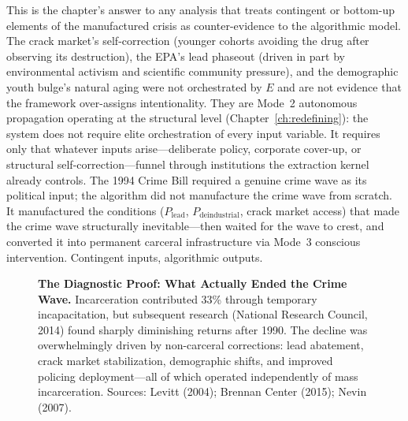 This is the chapter's answer to any analysis that treats contingent or bottom-up elements of the manufactured crisis as counter-evidence to the algorithmic model. The crack market's self-correction (younger cohorts avoiding the drug after observing its destruction), the EPA's lead phaseout (driven in part by environmental activism and scientific community pressure), and the demographic youth bulge's natural aging were not orchestrated by $E$ and are not evidence that the framework over-assigns intentionality. They are Mode~2 autonomous propagation operating at the structural level (Chapter~\ref{ch:redefining}): the system does not require elite orchestration of every input variable. It requires only that whatever inputs arise---deliberate policy, corporate cover-up, or structural self-correction---funnel through institutions the extraction kernel already controls. The 1994 Crime Bill required a genuine crime wave as its political input; the algorithm did not manufacture the crime wave from scratch. It manufactured the conditions ($P_{\text{lead}}$, $P_{\text{deindustrial}}$, crack market access) that made the crime wave structurally inevitable---then waited for the wave to crest, and converted it into permanent carceral infrastructure via Mode~3 conscious intervention. Contingent inputs, algorithmic outputs.

\begin{figure}[htbp]
\centering
{}
\caption[The Diagnostic Proof]{\textbf{The Diagnostic Proof: What Actually Ended the Crime Wave.} Incarceration contributed 33\% through temporary incapacitation, but subsequent research (National Research Council, 2014) found sharply diminishing returns after 1990. The decline was overwhelmingly driven by non-carceral corrections: lead abatement, crack market stabilization, demographic shifts, and improved policing deployment---all of which operated independently of mass incarceration. Sources: Levitt (2004); Brennan Center (2015); Nevin (2007).}
\label{fig:crime_decline}
\end{figure}
